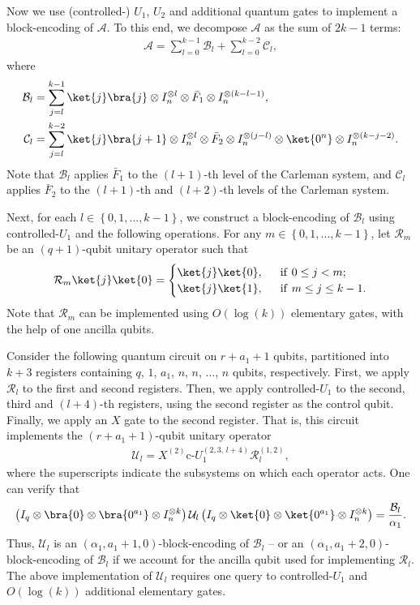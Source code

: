 \documentclass[superscriptaddress,onecolumn,nofootinbib,longbibliography,a4paper,accepted=2026-09-29]{quantumarticle}
\theoremstyle{plain}
\theoremstyle{definition}
\numberwithin{thm}{section}
\numberwithin{assumption}{section}
\numberwithin{lemma}{section}
\numberwithin{prop}{section}
\numberwithin{cor}{section}
\numberwithin{definition}{section}
\numberwithin{rmk}{section}
\numberwithin{equation}{section}
\newcommand{\lrb}[1]{\left ( #1 \right )}
\newcommand{\lrcb}[1]{\left \{ #1 \right \}}
\newcommand{\mylog}[1]{\operatorname{log} \lrb{#1}}
\newcommand{\myO}[1]{O\lrb{#1}}
\begin{document}
Now we use (controlled-) $U_1$, $U_2$ and additional quantum gates to implement a block-encoding of $\mathcal{A}$. To this end, we decompose $\mathcal{A}$ as the sum of $2k-1$ terms:
\begin{align}
    \mathcal{A} = \sum_{l=0}^{k-1} \mathcal{B}_l + 
    \sum_{l=0}^{k-2} \mathcal{C}_l, 
\end{align}
where
\begin{align}
    \mathcal{B}_l &= \sum_{j=l}^{k-1} \ket{j}\bra{j} \otimes I_n^{\otimes l} \otimes \bar{F}_1 \otimes I_n^{\otimes (k-l-1)}, \\
    \mathcal{C}_l &=\sum_{j=l}^{k-2} \ket{j}\bra{j+1}\otimes I_n^{\otimes l} \otimes \bar{F}_2 \otimes I_n^{\otimes (j-l)} \otimes \ket{0^n} \otimes I_n^{\otimes (k-j-2)}.
\end{align}
Note that $\mathcal{B}_l$ applies $\bar{F}_1$ to the $(l+1)$-th level of the Carleman system, and 
$\mathcal{C}_l$ applies $\bar{F}_2$ to the $(l+1)$-th and $(l+2)$-th levels of the Carleman system.

Next, for each $l \in \lrcb{0,1,\dots,k-1}$, 
we construct a block-encoding of $\mathcal{B}_l$ using controlled-$U_1$ and the following operations. For any $m \in \lrcb{0,1,\dots,k-1}$, let $\mathcal{R}_m$ be an $(q+1)$-qubit unitary operator such that
\begin{align}
    \mathcal{R}_m \ket{j}\ket{0} =
    \begin{cases}
    \ket{j}\ket{0}, ~&~\mathrm{if}~0\le j < m;\\        
    \ket{j}\ket{1}, ~&~\mathrm{if}~m\le j\le k-1.
    \end{cases}
\label{eq:def_rm}
\end{align}
Note that $\mathcal{R}_m$ can be implemented using $\myO{\mylog{k}}$ elementary gates, with the help of one ancilla qubits.

Consider the following quantum circuit on $r +a_1+1$ qubits, partitioned into $k+3$ registers containing $q$, $1$, $a_1$, $n$, $n$, $\dots$, $n$ qubits, respectively. First, we apply $\mathcal{R}_l$ to the first and second registers. Then, we apply controlled-$U_1$ to the second, third and $(l+4)$-th registers, using the second register as the control qubit. Finally, we apply an $X$ gate to the second register. That is, this circuit implements the $(r+a_1+1)$-qubit unitary operator
\begin{align}
\mathcal{U}_l = X^{(2)}\text{c-}U_1^{(2, 3,\,l+4)}\mathcal{R}_l^{(1,2)},
\end{align}
where the superscripts indicate the subsystems on which each operator acts. One can verify that
\begin{align}
    \lrb{I_q \otimes \bra{0} \otimes \bra{0^{a_1}} \otimes I_n^{\otimes k}}\mathcal{U}_l
    \lrb{I_q \otimes \ket{0} \otimes \ket{0^{a_1}} \otimes I_n^{\otimes k}}    
    =\frac{\mathcal{B}_l}{\alpha_1}.    
\end{align}
Thus, $\mathcal{U}_l$ is an $(\alpha_1, a_1+1, 0)$-block-encoding of $\mathcal{B}_l$ -- or  
an $(\alpha_1, a_1+2, 0)$-block-encoding of $\mathcal{B}_l$ if we account for the ancilla qubit used for implementing $\mathcal{R}_l$. The above implementation of $\mathcal{U}_l$ requires one query to controlled-$U_1$ and $\myO{\mylog{k}}$ additional elementary gates.
\end{document}
